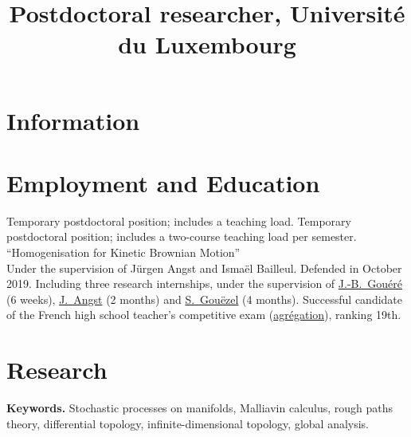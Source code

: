 \documentclass[11pt,classic,colorlinks]{moderncv}
\title{Postdoctoral researcher, Université du Luxembourg}
\begin{document}
\makecvtitle
{}

\vspace{-25pt}

\section{Information}

\section{Employment and Education}

        {Temporary postdoctoral position; includes a teaching load.}
        {Temporary postdoctoral position; includes a two-course teaching load per semester.}
        {``Homogenisation for Kinetic Brownian Motion''\\Under the supervision of Jürgen Angst and Ismaël Bailleul. Defended in October 2019.}
   {Including three research internships, under the supervision of \href{http://www.lmpt.univ-tours.fr/~gouere/}{J.-B.~Gouéré} (6 weeks), \href{https://perso.univ-rennes1.fr/jurgen.angst/}{J.~Angst} (2 months) and \href{http://www.math.sciences.univ-nantes.fr/~gouezel/}{S.~Gouëzel} (4 months). \newline
    Successful candidate of the French high school teacher's competitive exam (\href{https://en.wikipedia.org/wiki/Agr\%C3\%A9gation}{agrégation}), ranking 19th.}

\section{Research}

\textbf{Keywords.} Stochastic processes on manifolds, Malliavin calculus, rough paths theory, differential topology, infinite-dimensional topology, global analysis.
\end{document}
